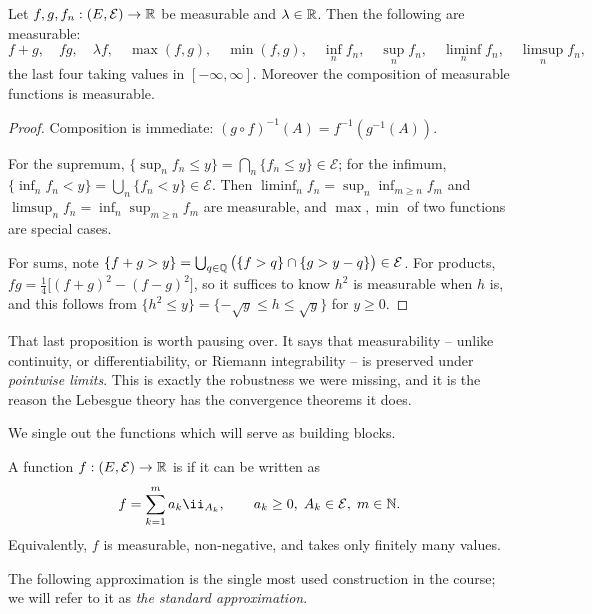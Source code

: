 \documentclass[a4paper]{scrartcl}
\newcommand{\cE}{\mathcal{E}}
\newcommand{\ind}{\ii}
\begin{document}
\begin{proposition}\label{prop:meas-stable}
	Let $f, g, f_n : (E,\cE) \to \R$ be measurable and $\lambda \in \mathbb{R}$. Then the following are measurable:
	$$
	f + g, \quad fg, \quad \lambda f, \quad \max(f,g), \quad \min(f,g), \quad \inf_n f_n, \quad \sup_n f_n, \quad \liminf_n f_n, \quad \limsup_n f_n,\!\!
	$$
	the last four taking values in $[-\infty,\infty]$. Moreover the composition of measurable functions is measurable.
\end{proposition}
\begin{proof}
	Composition is immediate: $(g \circ f)^{-1}(A) = f^{-1}(g^{-1}(A))$.

	For the supremum, $\{\sup_n f_n \leq y\} = \bigcap_n \{f_n \leq y\} \in \cE$; for the infimum, $\{\inf_n f_n < y\} = \bigcup_n \{f_n < y\} \in \cE$. Then $\liminf_n f_n = \sup_n \inf_{m \geq n} f_m$ and $\limsup_n f_n = \inf_n \sup_{m \geq n} f_m$ are measurable, and $\max, \min$ of two functions are special cases.

	For sums, note $\{f + g > y\} = \bigcup_{q \in \Q} \big( \{f > q\} \cap \{g > y - q\}\big) \in \cE$. For products, $fg = \frac{1}{4}\big[(f+g)^2 - (f-g)^2\big]$, so it suffices to know $h^2$ is measurable when $h$ is, and this follows from $\{h^2 \leq y\} = \{-\sqrt y \leq h \leq \sqrt y\}$ for $y \geq 0$.
\end{proof}

That last proposition is worth pausing over. It says that measurability -- unlike continuity, or differentiability, or Riemann integrability -- is preserved under \emph{pointwise limits}. This is exactly the robustness we were missing, and it is the reason the Lebesgue theory has the convergence theorems it does.

We single out the functions which will serve as building blocks.

\begin{definition}
	A function $f : (E,\cE) \to \R$ is  if it can be written as
	$$
	f = \sum_{k=1}^m a_k \ind_{A_k}, \qquad a_k \geq 0, \; A_k \in \cE, \; m \in \N.
	$$
	Equivalently, $f$ is measurable, non-negative, and takes only finitely many values.
\end{definition}

The following approximation is the single most used construction in the course; we will refer to it as \emph{the standard approximation}.
\end{document}
